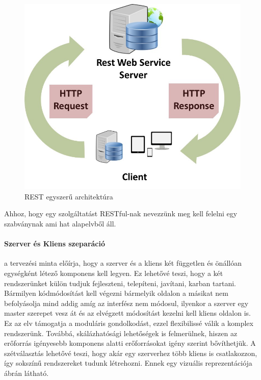 \begin{figure}[t]
	\includegraphics[width=150mm, keepaspectratio]{figures/rest_structure.jpeg}
	\caption{REST egyszerű architektúra}
	\label{fig:rest_structure}
\end{figure}

Ahhoz, hogy egy szolgáltatást RESTful-nak nevezzünk meg kell felelni egy szabványnak ami hat alapelvből áll.


\paragraph{Szerver és Kliens szeparáció} a tervezési minta előírja, hogy a szerver és a kliens két független és önállóan egységként létező komponens kell legyen. Ez lehetővé teszi, hogy a két rendszerünket külön tudjuk fejleszteni, telepíteni, javítani, karban tartani. Bármilyen kódmódosítást kell végezni bármelyik oldalon a másikat nem befolyásolja mind addig amíg az interfész nem módosul, ilyenkor a szerver egy master szerepet vesz át és az elvégzett módosítást kezelni kell kliens oldalon is. Ez az elv támogatja a moduláris gondolkodást, ezzel flexibilissé válik a komplex rendszerünk. Továbbá, skálázhatósági lehetőségek is felmerülnek, hiszen az erőforrás igényesebb komponens alatti erőforrásokat igény szerint bővíthetjük. A szétválasztás lehetővé teszi, hogy akár egy szerverhez több kliens is csatlakozzon, így sokszínű rendszereket tudunk létrehozni. Ennek egy vizuális reprezentációja  ábrán látható.


